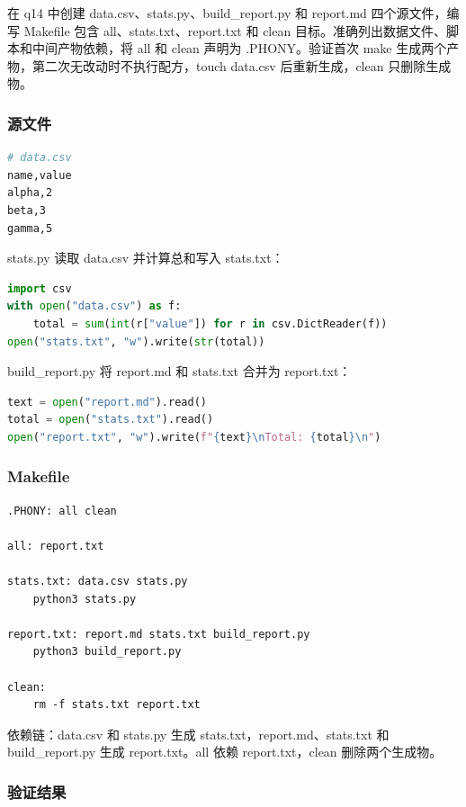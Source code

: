 \documentclass[UTF8]{ctexart}
\begin{document}
在 q14 中创建 data.csv、stats.py、build\_report.py 和 report.md 四个源文件，编写 Makefile 包含 all、stats.txt、report.txt 和 clean 目标。准确列出数据文件、脚本和中间产物依赖，将 all 和 clean 声明为 .PHONY。验证首次 make 生成两个产物，第二次无改动时不执行配方，touch data.csv 后重新生成，clean 只删除生成物。

\subsubsection{源文件}

\begin{lstlisting}[language=bash]
# data.csv
name,value
alpha,2
beta,3
gamma,5
\end{lstlisting}

stats.py 读取 data.csv 并计算总和写入 stats.txt：

\begin{lstlisting}[language=Python]
import csv
with open("data.csv") as f:
    total = sum(int(r["value"]) for r in csv.DictReader(f))
open("stats.txt", "w").write(str(total))
\end{lstlisting}

build\_report.py 将 report.md 和 stats.txt 合并为 report.txt：

\begin{lstlisting}[language=Python]
text = open("report.md").read()
total = open("stats.txt").read()
open("report.txt", "w").write(f"{text}\nTotal: {total}\n")
\end{lstlisting}

\subsubsection{Makefile}

\begin{lstlisting}
.PHONY: all clean

all: report.txt

stats.txt: data.csv stats.py
	python3 stats.py

report.txt: report.md stats.txt build_report.py
	python3 build_report.py

clean:
	rm -f stats.txt report.txt
\end{lstlisting}

依赖链：data.csv 和 stats.py 生成 stats.txt，report.md、stats.txt 和 build\_report.py 生成 report.txt。all 依赖 report.txt，clean 删除两个生成物。

\subsubsection{验证结果}
\end{document}
